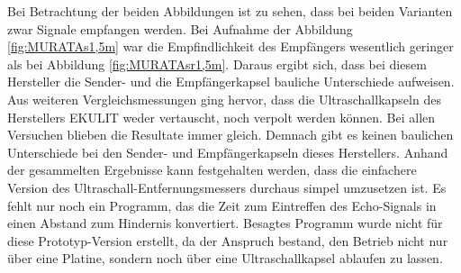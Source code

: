 Bei Betrachtung der beiden Abbildungen ist zu sehen, dass bei beiden Varianten zwar Signale empfangen werden. Bei Aufnahme der Abbildung \ref{fig:MURATAs1,5m} war die Empfindlichkeit des Empfängers wesentlich geringer als bei Abbildung \ref{fig:MURATAsr1,5m}. Daraus ergibt sich, dass bei diesem Hersteller die Sender- und die Empfängerkapsel bauliche Unterschiede aufweisen. Aus weiteren Vergleichsmessungen ging hervor, dass die Ultraschallkapseln des Herstellers EKULIT weder vertauscht, noch verpolt werden können. Bei allen Versuchen blieben die Resultate immer gleich. Demnach gibt es keinen baulichen Unterschiede bei den Sender- und Empfängerkapseln dieses Herstellers.
Anhand der gesammelten Ergebnisse kann festgehalten werden, dass die einfachere Version des Ultraschall-Entfernungsmessers durchaus simpel umzusetzen ist. Es fehlt nur noch ein Programm, das die Zeit zum Eintreffen des Echo-Signals in einen Abstand zum Hindernis konvertiert. Besagtes Programm wurde nicht für diese Prototyp-Version erstellt, da der Anspruch bestand, den Betrieb nicht nur über eine Platine, sondern noch über eine Ultraschallkapsel ablaufen zu lassen.
\newpage
